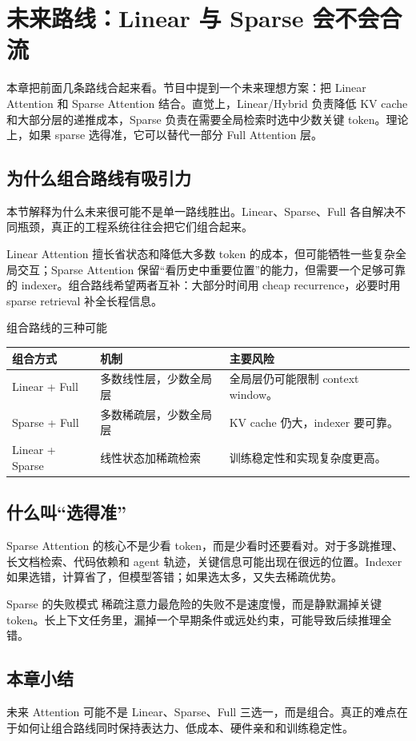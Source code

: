 \section{未来路线：Linear 与 Sparse 会不会合流}

本章把前面几条路线合起来看。节目中提到一个未来理想方案：把 Linear Attention 和 Sparse Attention 结合。直觉上，Linear/Hybrid 负责降低 KV cache 和大部分层的递推成本，Sparse 负责在需要全局检索时选中少数关键 token。理论上，如果 sparse 选得准，它可以替代一部分 Full Attention 层。

\subsection{为什么组合路线有吸引力}

本节解释为什么未来很可能不是单一路线胜出。Linear、Sparse、Full 各自解决不同瓶颈，真正的工程系统往往会把它们组合起来。

Linear Attention 擅长省状态和降低大多数 token 的成本，但可能牺牲一些复杂全局交互；Sparse Attention 保留“看历史中重要位置”的能力，但需要一个足够可靠的 indexer。组合路线希望两者互补：大部分时间用 cheap recurrence，必要时用 sparse retrieval 补全长程信息。

\begin{knowledgebox}{组合路线的三种可能}
\begin{tabularx}{\textwidth}{p{}p{}X}
\toprule
组合方式 & 机制 & 主要风险 \\
\midrule
Linear + Full & 多数线性层，少数全局层 & 全局层仍可能限制 context window。 \\
Sparse + Full & 多数稀疏层，少数全局层 & KV cache 仍大，indexer 要可靠。 \\
Linear + Sparse & 线性状态加稀疏检索 & 训练稳定性和实现复杂度更高。 \\
\bottomrule
\end{tabularx}
\end{knowledgebox}

\subsection{什么叫“选得准”}

Sparse Attention 的核心不是少看 token，而是少看时还要看对。对于多跳推理、长文档检索、代码依赖和 agent 轨迹，关键信息可能出现在很远的位置。Indexer 如果选错，计算省了，但模型答错；如果选太多，又失去稀疏优势。

\begin{warningbox}{Sparse 的失败模式}
稀疏注意力最危险的失败不是速度慢，而是静默漏掉关键 token。长上下文任务里，漏掉一个早期条件或远处约束，可能导致后续推理全错。
\end{warningbox}

\subsection{本章小结}

未来 Attention 可能不是 Linear、Sparse、Full 三选一，而是组合。真正的难点在于如何让组合路线同时保持表达力、低成本、硬件亲和和训练稳定性。

